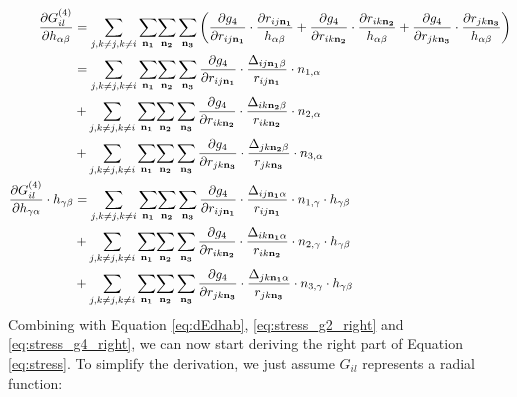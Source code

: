 \documentclass[preprint]{revtex4-2}
\begin{document}
\begin{align}
\frac{\partial G_{il}^{(4)}}{\partial h_{\alpha\beta}} & =
    \sum_{j, k \neq j, k \neq i}{
        \sum_{\mathbf{n_1}}}{\sum_{\mathbf{n_2}}{\sum_{\mathbf{n_3}}{
    \left(
        \frac{\partial g_4}{\partial r_{ij\mathbf{n_1}}}\cdot\frac{\partial r_{ij\mathbf{n_1}}}{h_{\alpha\beta}} +
        \frac{\partial g_4}{\partial r_{ik\mathbf{n_2}}}\cdot\frac{\partial r_{ik\mathbf{n_2}}}{h_{\alpha\beta}} +
        \frac{\partial g_4}{\partial r_{jk\mathbf{n_3}}}\cdot\frac{\partial r_{jk\mathbf{n_3}}}{h_{\alpha\beta}}
    \right)
}}} \nonumber \\
& =  \sum_{j, k \neq j, k \neq i}{
        \sum_{\mathbf{n_1}}}{\sum_{\mathbf{n_2}}{\sum_{\mathbf{n_3}}{
    \frac{\partial g_4}{\partial r_{ij\mathbf{n_1}}} \cdot 
    \frac{\Delta_{ij\mathbf{n_1}\beta}}{r_{ij\mathbf{n_1}}} \cdot n_{1,\alpha}
}}} \nonumber \\
& + \sum_{j, k \neq j, k \neq i}{
    \sum_{\mathbf{n_1}}}{\sum_{\mathbf{n_2}}{\sum_{\mathbf{n_3}}{
\frac{\partial g_4}{\partial r_{ik\mathbf{n_2}}} \cdot 
\frac{\Delta_{ik\mathbf{n_2}\beta}}{r_{ik\mathbf{n_2}}} \cdot n_{2,\alpha}
}}} \nonumber \\
& + \sum_{j, k \neq j, k \neq i}{
    \sum_{\mathbf{n_1}}}{\sum_{\mathbf{n_2}}{\sum_{\mathbf{n_3}}{
\frac{\partial g_4}{\partial r_{jk\mathbf{n_3}}} \cdot 
\frac{\Delta_{jk\mathbf{n_2}\beta}}{r_{jk\mathbf{n_3}}} \cdot n_{3,\alpha}
}}} \\
\label{eq:stress_g4_right}
\frac{\partial G_{il}^{(4)}}{\partial h_{\gamma\alpha}} \cdot h_{\gamma\beta} & = 
\sum_{j, k \neq j, k \neq i}{
    \sum_{\mathbf{n_1}}}{\sum_{\mathbf{n_2}}{\sum_{\mathbf{n_3}}{
\frac{\partial g_4}{\partial r_{ij\mathbf{n_1}}} \cdot 
\frac{\Delta_{ij\mathbf{n_1}\alpha}}{r_{ij\mathbf{n_1}}} \cdot n_{1,\gamma} \cdot h_{\gamma\beta}
}}} \nonumber \\
& + \sum_{j, k \neq j, k \neq i}{
    \sum_{\mathbf{n_1}}}{\sum_{\mathbf{n_2}}{\sum_{\mathbf{n_3}}{
\frac{\partial g_4}{\partial r_{ik\mathbf{n_2}}} \cdot 
\frac{\Delta_{ik\mathbf{n_1}\alpha}}{r_{ik\mathbf{n_2}}} \cdot n_{2,\gamma} \cdot h_{\gamma\beta}
}}} \nonumber \\
& + \sum_{j, k \neq j, k \neq i}{
    \sum_{\mathbf{n_1}}}{\sum_{\mathbf{n_2}}{\sum_{\mathbf{n_3}}{
\frac{\partial g_4}{\partial r_{jk\mathbf{n_3}}} \cdot 
\frac{\Delta_{jk\mathbf{n_1}\alpha}}{r_{jk\mathbf{n_3}}} \cdot n_{3,\gamma} \cdot h_{\gamma\beta}
}}}
\end{align}
Combining with Equation \ref{eq:dEdhab}, \ref{eq:stress_g2_right} and 
\ref{eq:stress_g4_right}, we can now start deriving the right part of Equation 
\ref{eq:stress}. To simplify the derivation, we just assume $G_{il}$ represents
a radial function:
\newcommand{\dE}{\partial{E^{total}}}
\end{document}
